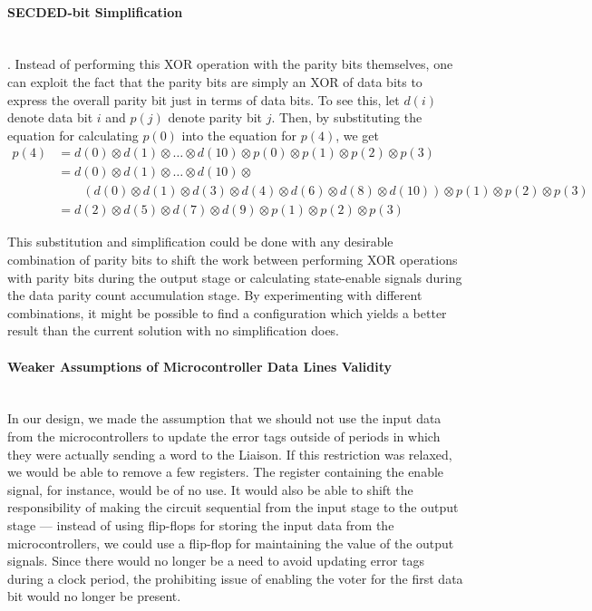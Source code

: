 \paragraph{SECDED-bit Simplification} \hfill \\
. Instead of
performing this XOR operation with the parity bits themselves, one can
exploit the fact that the parity bits are simply an XOR of data bits
to express the overall parity bit just in terms of data bits. To see
this, let $d(i)$ denote data bit $i$ and $p(j)$ denote parity bit $j$.
Then, by substituting the equation for calculating $p(0)$ into the
equation for $p(4)$, we get
\begin{align*}
  p(4) &= d(0) \otimes d(1) \otimes \ldots \otimes d(10) \otimes p(0) \otimes p(1) \otimes p(2) \otimes p(3) \\
  &= d(0) \otimes d(1) \otimes \ldots \otimes d(10) \otimes \\
  & \qquad (d(0) \otimes d(1) \otimes d(3) \otimes d(4) \otimes d(6)
  \otimes d(8) \otimes d(10)) \otimes p(1) \otimes p(2) \otimes p(3) \\
  &= d(2) \otimes d(5) \otimes d(7) \otimes d(9) \otimes p(1) \otimes p(2) \otimes p(3)
\end{align*}

This substitution and simplification could be done with any desirable
combination of parity bits to shift the work between performing XOR
operations with parity bits during the output stage or calculating
state-enable signals during the data parity count accumulation
stage. By experimenting with different combinations, it might be
possible to find a configuration which yields a better
result than the current solution with no simplification does. 

\paragraph{Weaker Assumptions of Microcontroller Data Lines Validity} \hfill \\
In our design, we made the assumption that we should not use the input
data from the microcontrollers to update the error tags outside of
periods in which they were actually sending a word to the Liaison. If
this restriction was relaxed, we would be able to remove a few
registers. The register containing the enable signal, for instance,
would be of no use. It would also be able to shift the responsibility
of making the circuit sequential from the input stage to the output
stage --- instead of using flip-flops for storing the input data from
the microcontrollers, we could use a flip-flop for maintaining the
value of the output signals. Since there would no longer be a need to
avoid updating error tags during a clock period, the prohibiting issue
of enabling the voter for the first data bit would no longer be
present.


